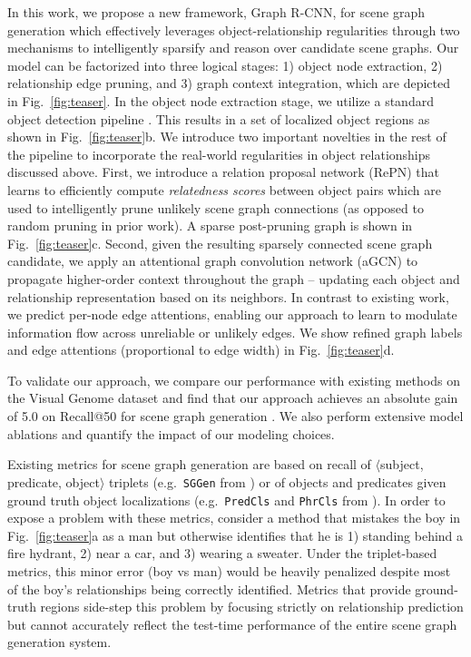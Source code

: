  In this work, we propose a new framework, Graph R-CNN, for scene graph generation which effectively leverages object-relationship regularities through two mechanisms to intelligently sparsify and reason over candidate scene graphs. Our model can be factorized into three logical stages: 1) object node extraction, 2) relationship edge pruning, and 3) graph context integration, which are depicted in Fig.~\ref{fig:teaser}.
% 
In the object node extraction stage, we utilize a standard object detection pipeline \cite{ren2015faster}. This results in a set of localized object regions as shown in Fig.~\ref{fig:teaser}b.
%
We introduce two important novelties in the rest of the pipeline to incorporate the real-world regularities in object relationships discussed above.
%
First, we introduce a relation proposal network (RePN) that learns to efficiently compute \emph{relatedness scores} between object pairs which are used to intelligently prune unlikely scene graph connections (as opposed to random pruning in prior work). A sparse post-pruning graph is shown in Fig.~\ref{fig:teaser}c.
%
Second, given the resulting sparsely connected scene graph candidate, we apply an attentional graph convolution network (aGCN) to propagate higher-order context throughout the graph -- updating each object and relationship representation based on its neighbors. In contrast to existing work, we predict per-node edge attentions, enabling our approach to learn to modulate information flow across unreliable or unlikely edges. We show refined graph labels and edge attentions (proportional to edge width) in Fig.~\ref{fig:teaser}d.

To validate our approach, we compare our performance with existing methods on the Visual Genome \cite{krishna2017visual} dataset and find that our approach achieves an absolute gain of 5.0 on Recall@50 for scene graph generation \cite{xu2017scene}. We also perform extensive model ablations and quantify the impact of our modeling choices.

%
Existing metrics for scene graph generation are based on recall of 
$\langle$subject, predicate, object$\rangle$ triplets (e.g.~\texttt{SGGen} from \cite{krishna2017visual}) 
or of objects and predicates given ground truth object localizations (e.g.~\texttt{PredCls} and \texttt{PhrCls} from \cite{krishna2017visual}). 
In order to expose a problem with these metrics, consider a method that mistakes the boy in Fig.~\ref{fig:teaser}a as a man but 
otherwise identifies that he is 1) standing behind a fire hydrant, 
2) near a car, and 
3) wearing a sweater. Under the triplet-based metrics, 
this minor error (boy vs man) would be heavily penalized despite most of the boy's relationships being correctly identified. 
Metrics that provide ground-truth regions side-step this problem by focusing strictly on relationship prediction 
but cannot accurately reflect the test-time performance of the entire scene graph generation system. 

